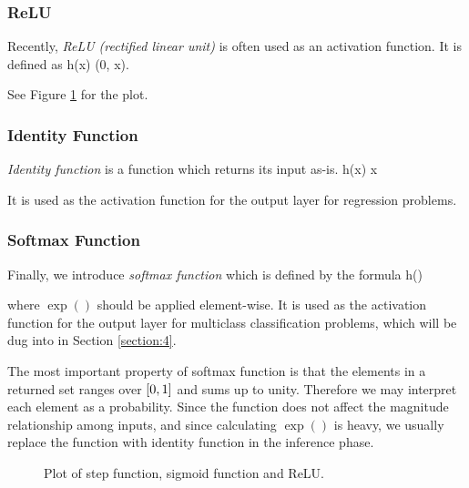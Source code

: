 \documentclass{article}
\theoremstyle{definition}
\newcommand{\sect}[1]{Section \ref{section:#1}}
\newcommand{\fig}[1]{Figure \ref{fig:#1}}
\begin{document}
\subsubsection{ReLU} \label{section:3.2.3}

Recently, {\it ReLU (rectified linear unit)} is often used as an activation function. It is defined as
\begineq
h(x) \equiv {} (0, x). 
\edeq

See \fig{3.2} for the plot.

\subsubsection{Identity Function}

{\it Identity function} is a function which returns its input as-is.
\begineq
h(x) \equiv x 
\edeq

It is used as the activation function for the output layer for regression problems.

\subsubsection{Softmax Function} \label{section:3.2.5}

Finally, we introduce {\it softmax function} which is defined by the formula
\begineq
h() \equiv {} 
\edeq

where $\exp()$ should be applied element-wise. It is used as the activation function for the output layer for multiclass classification problems, which will be dug into in \sect{4}.

\newpage

The most important property of softmax function is that the elements in a returned set ranges over $\left[ 0, 1 \right]$ and sums up to unity. Therefore we may interpret each element as a probability. Since the function does not affect the magnitude relationship among inputs, and since calculating $\exp()$ is heavy, we usually replace the function with identity function in the inference phase.

\enter
\begin{figure}[H]
    \centering
    \begin{subfigure}[H]{1.0\textwidth}
	\end{subfigure}
    \caption{Plot of step function, sigmoid function and ReLU.}
    \label{fig:3.2}
\end{figure}
\end{document}
